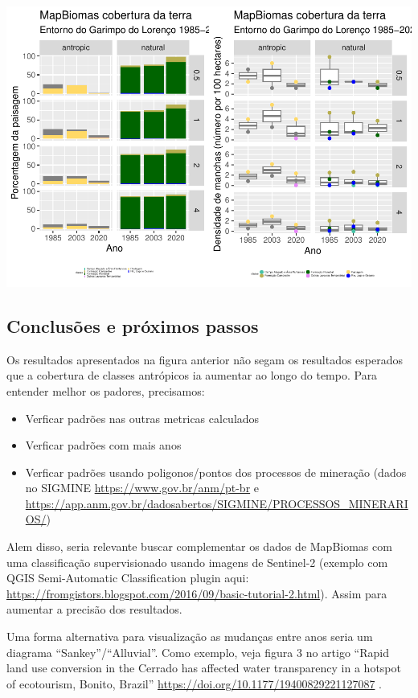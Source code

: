 \documentclass[
]{article}
\providecommand{\tightlist}{%
  \setlength{\itemsep}{0pt}\setlength{\parskip}{0pt}}
\begin{document}
\includegraphics{epr_files/figure-latex/unnamed-chunk-71-1.pdf}

\newpage

\hypertarget{conclusuxf5es-e-pruxf3ximos-passos}{%
\subsection{Conclusões e próximos passos}\label{conclusuxf5es-e-pruxf3ximos-passos}}

Os resultados apresentados na figura anterior não segam os resultados esperados que a cobertura de classes antrópicos ia aumentar ao longo do tempo.
Para entender melhor os padores, precisamos:

\begin{itemize}
\tightlist
\item
  Verficar padrões nas outras metricas calculados
\item
  Verficar padrões com mais anos
\item
  Verficar padrões usando poligonos/pontos dos processos de mineração (dados no SIGMINE \url{https://www.gov.br/anm/pt-br} e \url{https://app.anm.gov.br/dadosabertos/SIGMINE/PROCESSOS_MINERARIOS/})
\end{itemize}

Alem disso, seria relevante buscar complementar os dados de MapBiomas com uma classificação supervisionado usando imagens de Sentinel-2 (exemplo com QGIS Semi-Automatic Classification plugin aqui: \url{https://fromgistors.blogspot.com/2016/09/basic-tutorial-2.html}). Assim para aumentar a precisão dos resultados.

Uma forma alternativa para visualização as mudanças entre anos seria um diagrama ``Sankey''/``Alluvial''. Como exemplo, veja figura 3 no artigo ``Rapid land use conversion in the Cerrado has affected water transparency in a hotspot of ecotourism, Bonito, Brazil'' \url{https://doi.org/10.1177/19400829221127087} .
\end{document}

